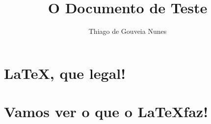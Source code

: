 \documentclass{article}
\begin{document}
\title{O Documento de Teste}
\author{Thiago de Gouveia Nunes}
\maketitle

\tableofcontents

\section{\LaTeX, que legal!}
\section{Vamos ver o que o \LaTeX faz!}
\end{document}
